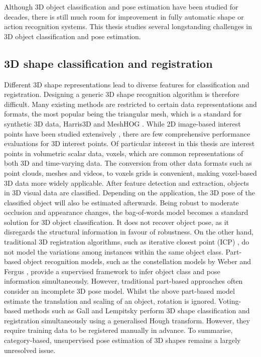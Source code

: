 Although 3D object classification and pose estimation have been studied for decades, there is still much room for improvement in fully automatic shape or action recognition systems. 
This thesis studies several longstanding challenges in 3D object classification and pose estimation.  

\subsection{3D shape classification and registration} 

Different 3D shape representations lead to diverse features for classification and registration. Designing a generic 3D shape recognition algorithm is therefore difficult. Many existing methods are restricted to certain data representations and formats, the most popular being the triangular mesh, which is a standard for synthetic 3D data, \eg Harris3D \cite{Sipiran2011} and MeshHOG \cite{Zaharescu2009}.     
While 2D image-based interest points have been studied extensively \cite{Mikolajczyk2005}, there are few comprehensive performance evaluations for 3D interest points. 
Of particular interest in this thesis are interest points in volumetric scalar data, \ie voxels, which are common representations of both 3D and time-varying data. 
The conversion from other data formats such as point clouds, meshes and videos, to voxels grids is convenient, making voxel-based 3D data more widely applicable. 
After feature detection and extraction, objects in 3D visual data are classified.  
Depending on the application, the 3D pose of the classified object will also be estimated afterwards. 
Being robust to moderate occlusion and appearance changes, the bag-of-words model becomes a standard solution for 3D object classification. It does not recover object pose, as it disregards the structural information in favour of robustness. 
On the other hand, traditional 3D registration algorithms, such as iterative closest point (ICP) \cite{Besl1992}, do not model the variations among instances within the same object class.
Part-based object recognition models, such as the constellation models by Weber \etal \cite{Weber2000} and Fergus \etal \cite{Fergus2007}, provide a supervised framework to infer object class and pose information simultaneously. However, traditional part-based approaches often consider an incomplete 3D pose model. Whilst the above part-based model estimate the translation and scaling of an object, rotation is ignored.      
Voting-based methods such as Gall and Lempitsky \cite{Gall2009a} perform 3D shape classification and registration simultaneously using a generalised Hough transform. However, they require training data to be registered manually in advance.  
To summarise, category-based, unsupervised pose estimation of 3D shapes remains a largely unresolved issue. 

